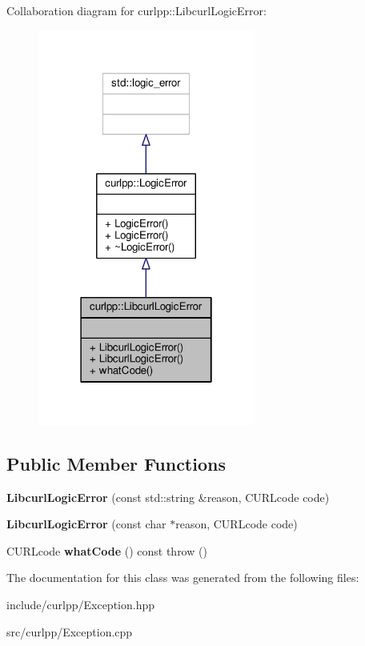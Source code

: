 Collaboration diagram for curlpp\-:\-:Libcurl\-Logic\-Error\-:
\nopagebreak
\begin{figure}[H]
\begin{center}
\leavevmode
\includegraphics[width=202pt]{classcurlpp_1_1LibcurlLogicError__coll__graph}
\end{center}
\end{figure}
\subsection*{Public Member Functions}
\begin{DoxyCompactItemize}
\item 
\hypertarget{classcurlpp_1_1LibcurlLogicError_acffdd4ce862ac43eb96b102f5b9f0f45}{{\bfseries Libcurl\-Logic\-Error} (const std\-::string \&reason, C\-U\-R\-Lcode code)}\label{classcurlpp_1_1LibcurlLogicError_acffdd4ce862ac43eb96b102f5b9f0f45}

\item 
\hypertarget{classcurlpp_1_1LibcurlLogicError_a08fc15f967b15331581b4ec4f1fdf0d3}{{\bfseries Libcurl\-Logic\-Error} (const char $\ast$reason, C\-U\-R\-Lcode code)}\label{classcurlpp_1_1LibcurlLogicError_a08fc15f967b15331581b4ec4f1fdf0d3}

\item 
\hypertarget{classcurlpp_1_1LibcurlLogicError_aebac936bdd535f954712bcf6f00dd3d9}{C\-U\-R\-Lcode {\bfseries what\-Code} () const   throw ()}\label{classcurlpp_1_1LibcurlLogicError_aebac936bdd535f954712bcf6f00dd3d9}

\end{DoxyCompactItemize}


The documentation for this class was generated from the following files\-:\begin{DoxyCompactItemize}
\item 
include/curlpp/Exception.\-hpp\item 
src/curlpp/Exception.\-cpp\end{DoxyCompactItemize}

